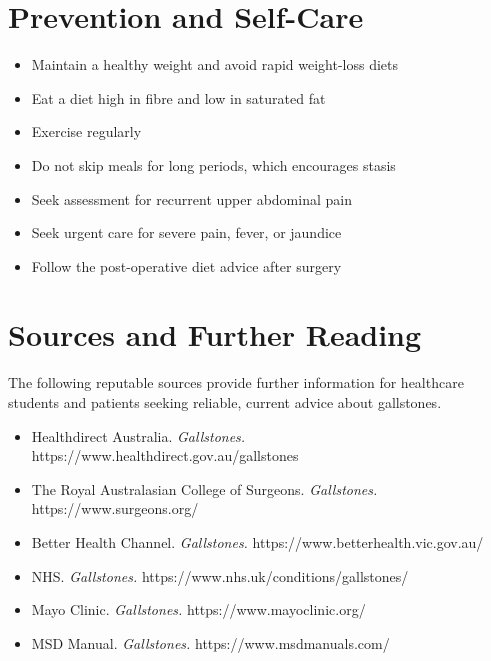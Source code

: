 \section*{Prevention and Self-Care}
\begin{itemize}
    \item Maintain a healthy weight and avoid rapid weight-loss diets
    \item Eat a diet high in fibre and low in saturated fat
    \item Exercise regularly
    \item Do not skip meals for long periods, which encourages stasis
    \item Seek assessment for recurrent upper abdominal pain
    \item Seek urgent care for severe pain, fever, or jaundice
    \item Follow the post-operative diet advice after surgery
\end{itemize}

\section*{Sources and Further Reading}
The following reputable sources provide further information for healthcare students and patients seeking reliable, current advice about gallstones.
\begin{itemize}
    \item Healthdirect Australia. \textit{Gallstones.} https://www.healthdirect.gov.au/gallstones
    \item The Royal Australasian College of Surgeons. \textit{Gallstones.} https://www.surgeons.org/
    \item Better Health Channel. \textit{Gallstones.} https://www.betterhealth.vic.gov.au/
    \item NHS. \textit{Gallstones.} https://www.nhs.uk/conditions/gallstones/
    \item Mayo Clinic. \textit{Gallstones.} https://www.mayoclinic.org/
    \item MSD Manual. \textit{Gallstones.} https://www.msdmanuals.com/
\end{itemize}
